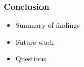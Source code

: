 \begin{frame}
    \frametitle{Conclusion}
    \begin{itemize}
        \item Summary of findings
        \item Future work
        \item Questions
    \end{itemize}
\end{frame}